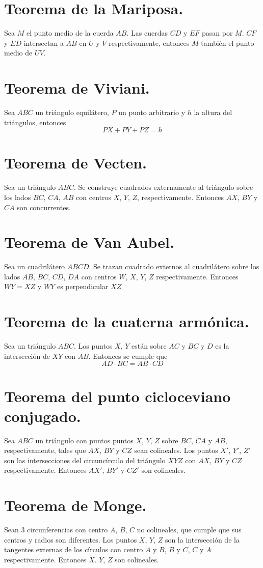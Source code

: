 \documentclass[12pt,a4paper,oneside]{book}
\begin{document}
\section{Teorema de la Mariposa.}
Sea $M$ el punto medio de la cuerda $AB$. Las cuerdas $CD$ y $EF$ pasan por $M$. $CF$ y $ED$ intersectan a $AB$ en $U$ y $V$ respectivamente, entonces $M$ también el punto medio de $UV$.
\section{Teorema de Viviani.}
Sea $ABC$ un triángulo equilátero, $P$ un punto arbitrario y $h$ la altura del triángulos, entonces $$PX + PY +PZ = h$$
\section{Teorema de Vecten.}
Sea un triángulo $ABC$. Se construye cuadrados externamente al triángulo sobre los lados $BC$, $CA$, $AB$ con centros $X$, $Y$, $Z$, respectivamente. Entonces $AX$, $BY$ y $CA$ son concurrentes.
\section{Teorema de Van Aubel.}
Sea un cuadrilátero $ABCD$. Se trazan cuadrado externos al cuadrilátero sobre los lados $AB$, $BC$, $CD$, $DA$ con centros $W$, $X$, $Y$, $Z$ respectivamente. Entonces $WY= XZ$ y $WY$ es perpendicular $XZ$
\section{Teorema de la cuaterna armónica.}
Sea un triángulo $ABC$. Los puntos $X$, $Y$ están sobre ${AC}$ y ${BC}$ y $D$ es la intersección de $XY$ con $AB$. Entonces se cumple que $$AD \cdot BC= AB \cdot CD$$

\section{Teorema del punto cicloceviano conjugado.}
Sea $ABC$ un triángulo con puntos puntos $X$, $Y$, $Z$ sobre ${BC}$, ${CA}$ y ${AB}$, respectivamente, tales que $AX$, $BY$ y $CZ$ sean colineales. Los puntos $X'$, $Y'$, $Z'$ son las intersecciones del circuncírculo del triángulo $XYZ$ con $AX$, $BY$ y $CZ$ respectivamente. Entonces $AX'$, $BY'$ y $CZ'$ son colineales.
\section{Teorema de Monge.}
Sean 3 circunferencias con centro $A$, $B$, $C$ no colineales, que cumple que sus centros y radios son diferentes. Los puntos $X$, $Y$, $Z$ son la intersección de la tangentes externas de los círculos con centro $A$ y $B$, $B$ y $C$, $C$ y $A$ respectivamente. Entonces $X$. $Y$, $Z$ son colineales. 
\end{document}
